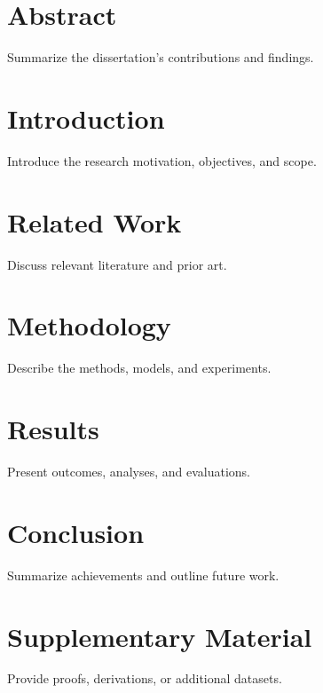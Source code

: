 \documentclass[
    language=english,
    doctype=dissertation,
    institution=none,
    titlestyle=book,
]{../../omnilatex}
\begin{document}
\maketitle

\frontmatter
\chapter{Abstract}
Summarize the dissertation's contributions and findings.

\tableofcontents
\listoffigures
\listoftables

\mainmatter
\chapter{Introduction}
Introduce the research motivation, objectives, and scope.

\chapter{Related Work}
Discuss relevant literature and prior art.

\chapter{Methodology}
Describe the methods, models, and experiments.

\chapter{Results}
Present outcomes, analyses, and evaluations.

\chapter{Conclusion}
Summarize achievements and outline future work.

\appendix
\chapter{Supplementary Material}
Provide proofs, derivations, or additional datasets.

\printbibliography
\end{document}
